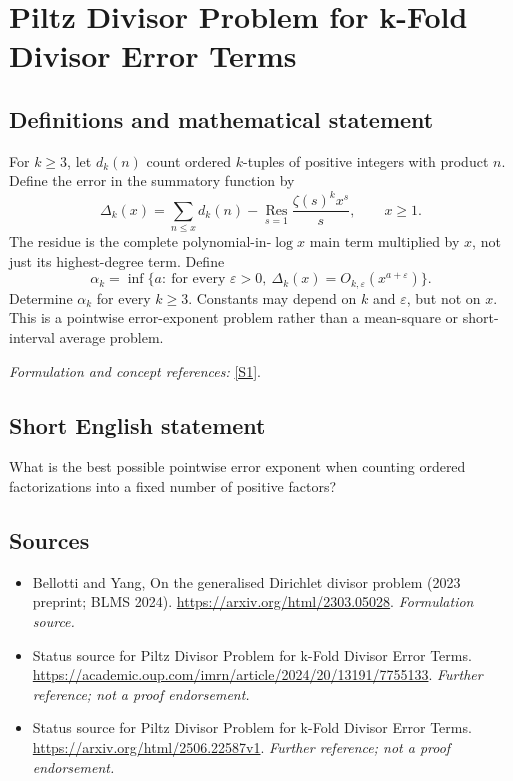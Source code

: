 \documentclass[11pt]{article}
\begin{document}
\section*{\texorpdfstring{Piltz Divisor Problem for k-Fold Divisor Error Terms}{Piltz Divisor Problem for k-Fold Divisor Error Terms}}\label{438}
\subsection{Definitions and mathematical statement}
For $k\ge3$, let $d_k(n)$ count ordered $k$-tuples of positive integers with product $n$. Define the error in the summatory function by
\[
 \Delta_k(x)=\sum_{n\le x}d_k(n)
 -\operatorname*{Res}_{s=1}\frac{\zeta(s)^k x^s}{s},\qquad x\ge1.
\]
The residue is the complete polynomial-in-$\log x$ main term multiplied by $x$, not just its highest-degree term. Define
\[
 \alpha_k=\inf\{a:\ \text{for every }{\varepsilon}>0,
 \ \Delta_k(x)=O_{k,{\varepsilon}}(x^{a+{\varepsilon}})\}.
\]
Determine $\alpha_k$ for every $k\ge3$. Constants may depend on $k$ and ${\varepsilon}$, but not on $x$. This is a pointwise error-exponent problem rather than a mean-square or short-interval average problem.
\par\smallskip\textit{Formulation and concept references:} \href{https://arxiv.org/html/2303.05028}{[S1]}.

\subsection{Short English statement}
What is the best possible pointwise error exponent when counting ordered factorizations into a fixed number of positive factors?
\subsection{Sources}
\begin{itemize}
\item[S1]Bellotti and Yang, On the generalised Dirichlet divisor problem (2023 preprint; BLMS 2024).
\url{https://arxiv.org/html/2303.05028}.
\textit{Formulation source.}
\item[S2]Status source for Piltz Divisor Problem for k-Fold Divisor Error Terms.
\url{https://academic.oup.com/imrn/article/2024/20/13191/7755133}.
\textit{Further reference; not a proof endorsement.}
\item[S3]Status source for Piltz Divisor Problem for k-Fold Divisor Error Terms.
\url{https://arxiv.org/html/2506.22587v1}.
\textit{Further reference; not a proof endorsement.}
\end{itemize}
\end{document}
